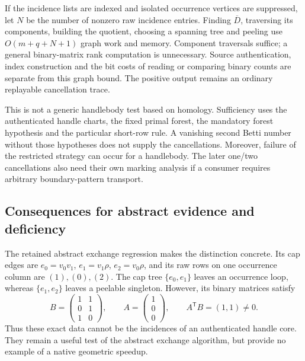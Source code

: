 If the incidence lists are indexed and isolated occurrence vertices are
suppressed, let $N$ be the number of nonzero raw incidence entries. Finding
$\overline D$, traversing its components, building the quotient, choosing
a spanning tree and peeling use $O(m+q+N+1)$ graph work and memory.
Component traversals suffice; a general binary-matrix rank computation is
unnecessary. Source authentication, index construction and the bit costs
of reading or comparing binary counts are separate from this graph bound.
The positive output remains an ordinary replayable cancellation trace.

This is not a generic handlebody test based on homology. Sufficiency uses
the authenticated handle charts, the fixed primal forest, the mandatory
forest hypothesis and the particular short-row rule. A vanishing second
Betti number without those hypotheses does not supply the cancellations.
Moreover, failure of the restricted strategy can occur for a handlebody.
The later one/two cancellations also need their own marking analysis if a
consumer requires arbitrary boundary-pattern transport.

\subsection{Consequences for abstract evidence and deficiency}

The retained abstract exchange regression makes the distinction concrete.
Its cap edges are
$e_0=v_0v_1$, $e_1=v_1\rho$, $e_2=v_0\rho$, and its raw rows on one
occurrence column are $(1),(0),(2)$. The cap tree $\{e_0,e_1\}$ leaves an
occurrence loop, whereas $\{e_1,e_2\}$ leaves a peelable singleton.
However, its binary matrices satisfy
\[
 B=\begin{pmatrix}1&1\\0&1\\1&0\end{pmatrix},\qquad
 A=\begin{pmatrix}1\\0\\0\end{pmatrix},\qquad
 A^{\mathsf T}B=(1,1)\ne0.
\]
Thus these exact data cannot be the incidences of an authenticated handle
core. They remain a useful test of the abstract exchange algorithm, but
provide no example of a native geometric speedup.


